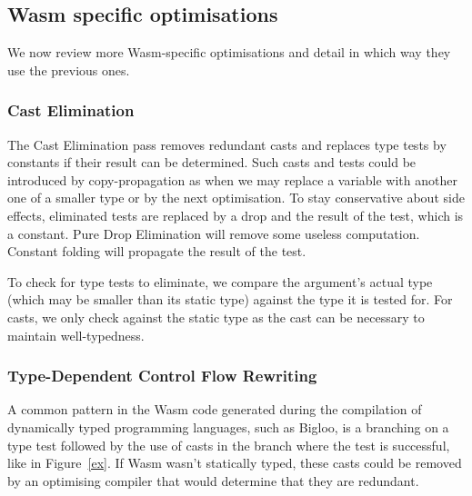 \documentclass[a4paper,11pt]{article}
\begin{document}

\subsection{Wasm specific optimisations}
We now review more Wasm-specific optimisations and detail in which way they use
the previous ones.
\subsubsection{Cast Elimination}
The Cast Elimination pass removes redundant casts and replaces type tests by
constants if their result can be determined. Such casts and tests could be
introduced by copy-propagation as when we may replace a variable with another
one of a smaller type or by the next optimisation. To stay conservative about
side effects, eliminated tests are replaced by a \textsf{drop} and the result of
the test, which is a constant. Pure Drop Elimination will remove some useless
computation. Constant folding will propagate the result of the test.

To check for type tests to eliminate, we compare the argument's actual type
(which may be smaller than its static type) against the type it is tested for.
For casts, we only check against the static type as the cast can be necessary to
maintain well-typedness.

\subsubsection{Type-Dependent Control Flow Rewriting}
A common pattern in the Wasm code generated during the compilation of
dynamically typed programming languages, such as Bigloo, is a branching on a
type test followed by the use of casts in the branch where the test is
successful, like in Figure~\ref{ex}. If Wasm wasn't statically typed, these
casts could be removed by an optimising compiler that would determine that they
are redundant.
\end{document}
